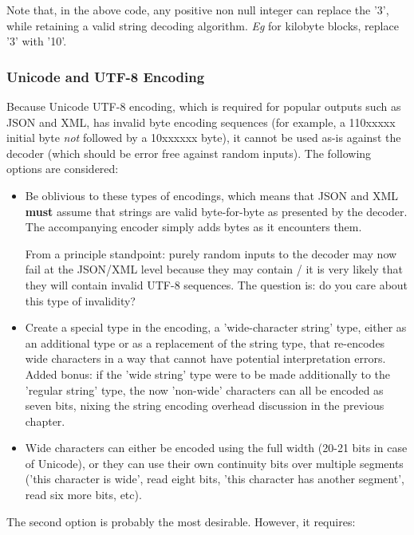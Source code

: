 Note that, in the above code, any positive non null integer can replace
the '3', while retaining a valid string decoding algorithm. \textit{Eg} for
kilobyte blocks, replace '3' with '10'.

\subsubsection{Unicode and UTF-8 Encoding}

Because Unicode \cite{bib:unicode} UTF-8 \cite{bib:utf8} encoding,
which is required for popular outputs such as
JSON and XML, has invalid byte encoding sequences
(for example, a 110xxxxx initial byte \textit{not} followed by a
10xxxxxx byte), it cannot be used as-is against the decoder (which
should be error free against random inputs).
The following options are considered:

\begin{itemize}
\item Be oblivious to these types of encodings, which means that JSON and XML
      \textbf{must} assume that strings are valid byte-for-byte
      as presented by the decoder. The accompanying encoder simply
      adds bytes as it encounters them.

      From a principle standpoint: purely random inputs to the
      decoder may now fail at the JSON/XML level because they may
      contain / it is very likely that they will contain invalid
      UTF-8 sequences. The question is: do you care about this type
      of invalidity?
\item Create a special type in the encoding, a 'wide-character string' type,
      either as an additional type or as a replacement of the string type,
      that re-encodes wide characters in a way that cannot have
      potential interpretation errors. Added bonus: if the 'wide string' type
      were to be made additionally to the 'regular string' type, the now
      'non-wide' characters can all be encoded as seven bits, nixing the
      string encoding overhead discussion in the previous chapter.
\item Wide characters can either be encoded using the full width (20-21 bits
      in case of Unicode), or they can use their own continuity bits over
      multiple segments ('this character is wide', read eight bits,
      'this character has another segment', read six more bits, etc).
\end{itemize}

The second option is probably the most desirable. However, it requires:

